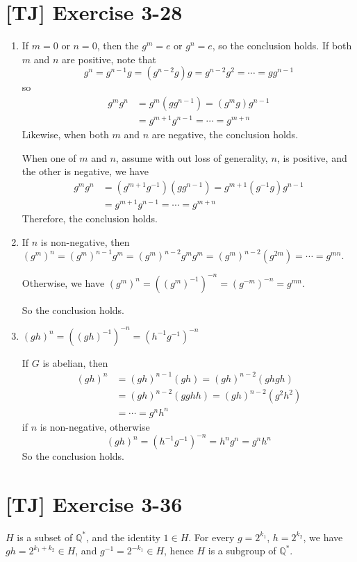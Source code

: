 \documentclass[a4paper,11pt,twocolumn]{article}
\begin{document}
  \section{[TJ] Exercise 3-28}
  \begin{enumerate}
    \item If $m = 0$ or $n = 0$, then the $g^m = e$ or $g^n = e$, so the conclusion holds. If both $m$ and $n$ are positive, note that
        $$ g^n = g^{n-1} g = (g^{n-2} g) g  = g^{n-2} g^2 = \cdots = g g^{n-1} $$
        so
        \begin{align*}
          g^m g^n &= g^m (g g^{n-1}) = (g^m g) g^{n-1} \\ &= g^{m+1} g^{n-1} = \cdots = g^{m+n}
        \end{align*}
        Likewise, when both $m$ and $n$ are negative, the conclusion holds. \par
        When one of $m$ and $n$, assume with out loss of generality, $n$, is positive, and the other is negative, we have
        \begin{align*}
          g^m g^n &= (g^{m+1} g^{-1}) (g g^{n-1}) = g^{m+1} (g^{-1}g)g^{n-1} \\ &= g^{m+1} g^{n-1} = \cdots = g^{m+n}
        \end{align*}
        Therefore, the conclusion holds.
    \item If $n$ is non-negative, then
      $(g^m)^n = (g^m)^{n-1} g^m  = (g^m)^{n-2} g^m g^m = (g^m)^{n-2} (g^{2m}) = \cdots = g^{mn}$. \par
      Otherwise, we have $(g^m)^n = ((g^m)^{-1})^{-n} = (g^{-m})^{-n} = g^{mn}$. \par
      So the conclusion holds.
    \item $(gh)^n = ((gh)^{-1})^{-n} = (h^{-1} g^{-1})^{-n}$ \par
    If $G$ is abelian, then
    \begin{align*}
        (gh)^n &= (gh)^{n-1}(gh) = (gh)^{n-2}(ghgh) \\ &= (gh)^{n-2}(gghh) = (gh)^{n-2}(g^2h^2) \\ &= \cdots = g^nh^n
    \end{align*}
    if $n$ is non-negative, otherwise
    $$(gh)^n = (h^{-1}g^{-1})^{-n} = h^n g^n = g^n h^n$$
    So the conclusion holds.
  \end{enumerate}

  \section{[TJ] Exercise 3-36}
  $H$ is a subset of $\mathbb{Q}^*$, and the identity $1 \in H$. For every $g = 2^{k_1}$, $h = 2^{k_2}$, we have $gh = 2^{k_1 + k_2} \in H$, and $g^{-1} = 2^{-k_1} \in H$, hence $H$ is a subgroup of $\mathbb{Q}^*$.
\end{document}
